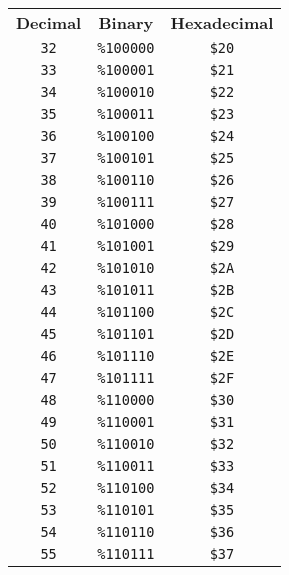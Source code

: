 \begin{multicols}{2}
\begin{center}
  \begin{tabular}{|c|c|c|}
  \hline
		\textbf{Decimal} & \textbf{Binary} & \textbf{Hexadecimal} \\ \hhline{|=|=|=|}   
 \texttt{32} & \texttt{\%100000} &  \texttt{\$20} \\ \hline
 \texttt{33} & \texttt{\%100001} &  \texttt{\$21} \\ \hline
 \texttt{34} & \texttt{\%100010} &  \texttt{\$22} \\ \hline
 \texttt{35} & \texttt{\%100011} &  \texttt{\$23} \\ \hline
 \texttt{36} & \texttt{\%100100} &  \texttt{\$24} \\ \hline
 \texttt{37} & \texttt{\%100101} &  \texttt{\$25} \\ \hline
 \texttt{38} & \texttt{\%100110} &  \texttt{\$26} \\ \hline
 \texttt{39} & \texttt{\%100111} &  \texttt{\$27} \\ \hline
 \texttt{40} & \texttt{\%101000} &  \texttt{\$28} \\ \hline
 \texttt{41} & \texttt{\%101001} &  \texttt{\$29} \\ \hline
 \texttt{42} & \texttt{\%101010} &  \texttt{\$2A} \\ \hline
 \texttt{43} & \texttt{\%101011} &  \texttt{\$2B} \\ \hline
 \texttt{44} & \texttt{\%101100} &  \texttt{\$2C} \\ \hline
 \texttt{45} & \texttt{\%101101} &  \texttt{\$2D} \\ \hline
 \texttt{46} & \texttt{\%101110} &  \texttt{\$2E} \\ \hline
 \texttt{47} & \texttt{\%101111} &  \texttt{\$2F} \\ \hline
 \texttt{48} & \texttt{\%110000} &  \texttt{\$30} \\ \hline
 \texttt{49} & \texttt{\%110001} &  \texttt{\$31} \\ \hline
 \texttt{50} & \texttt{\%110010} &  \texttt{\$32} \\ \hline
 \texttt{51} & \texttt{\%110011} &  \texttt{\$33} \\ \hline
 \texttt{52} & \texttt{\%110100} &  \texttt{\$34} \\ \hline
 \texttt{53} & \texttt{\%110101} &  \texttt{\$35} \\ \hline
 \texttt{54} & \texttt{\%110110} &  \texttt{\$36} \\ \hline
 \texttt{55} & \texttt{\%110111} &  \texttt{\$37} \\ \hline

\end{tabular}
\end{center}
\end{multicols}
